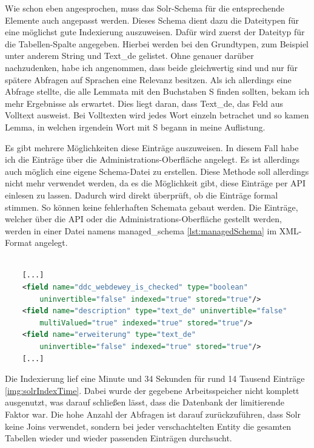 Wie schon eben angesprochen, muss das Solr-Schema für die entsprechende Elemente auch angepasst werden. Dieses Schema dient dazu die Dateitypen für eine möglichst gute Indexierung auszuweisen. Dafür wird zuerst der Dateityp für die Tabellen-Spalte angegeben. Hierbei werden bei den Grundtypen, zum Beispiel unter anderem String und Text\_de gelistet. Ohne genauer darüber nachzudenken, habe ich angenommen, dass beide gleichwertig sind und nur für spätere Abfragen auf Sprachen eine Relevanz besitzen. Als ich allerdings eine Abfrage stellte, die alle Lemmata mit den Buchstaben S finden sollten, bekam ich mehr Ergebnisse als erwartet. Dies liegt daran, dass Text\_de, das Feld aus Volltext ausweist. 
Bei Volltexten wird jedes Wort einzeln betrachet und so kamen Lemma, in welchen irgendein Wort mit S begann in meine Auflistung. 

Es gibt mehrere Möglichkeiten diese Einträge auszuweisen. In diesem Fall habe ich die Einträge über die Administrations-Oberfläche angelegt. Es ist allerdings auch möglich eine eigene Schema-Datei zu erstellen. Diese Methode soll allerdings nicht mehr verwendet werden, da es die Möglichkeit gibt, diese Einträge per API einlesen zu lassen. Dadurch wird direkt überprüft, ob die Einträge formal stimmen. So können keine fehlerhaften Schemata gebaut werden. Die Einträge, welcher über die API oder die Administrations-Oberfläche gestellt werden, werden in einer Datei namens managed\_schema \ref{lst:managedSchema} im XML-Format angelegt.


\begin{lstlisting}[language=xml, frame=single, label={lst:managedSchema}, 
    morekeywords={type,uninvertible,indexed,stored,field,multiValued, name}] 

    [...]
    <field name="ddc_webdewey_is_checked" type="boolean" 
        uninvertible="false" indexed="true" stored="true"/>
    <field name="description" type="text_de" uninvertible="false" 
        multiValued="true" indexed="true" stored="true"/>
    <field name="erweiterung" type="text_de" 
        uninvertible="false" indexed="true" stored="true"/>
    [...]

\end{lstlisting}

Die Indexierung lief eine Minute und 34 Sekunden für rund 14 Tausend Einträge \ref{img:solrIndexTime}. Dabei wurde der gegebene Arbeitsspeicher nicht komplett ausgenutzt, was darauf schließen lässt, dass die Datenbank der limitierende Faktor war. Die hohe Anzahl der Abfragen ist darauf zurückzuführen, dass Solr keine Joins verwendet, sondern bei jeder verschachtelten Entity die gesamten Tabellen wieder und wieder passenden Einträgen durchsucht.

